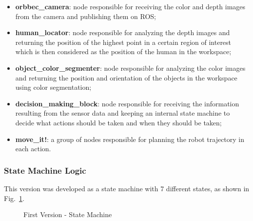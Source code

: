 \begin{itemize}
    \item \textbf{orbbec\_camera}: node responsible for receiving the color and depth images from the camera and publishing them on ROS;
    \item \textbf{human\_locator}: node responsible for analyzing the depth images and returning the position of the highest point in a certain region of interest which is then considered as the position of the human in the workspace;
    \item \textbf{object\_color\_segmenter}: node responsible for analyzing the color images and returning the position and orientation of the objects in the workspace using color segmentation;
    \item \textbf{decision\_making\_block}: node responsible for receiving the information resulting from the sensor data and keeping an internal state machine to decide what actions should be taken and when they should be taken;
    \item \textbf{move\_it!}: a group of nodes responsible for planning the robot trajectory in each action.
\end{itemize}

\subsubsection{State Machine Logic}

This version was developed as a state machine with 7 different states, as shown in Fig.~\ref{fig:demo1_state_machine}.

\begin{figure}[H]%
    \centering
    
    \caption{First Version - State Machine}
    \label{fig:demo1_state_machine}
\end{figure}

